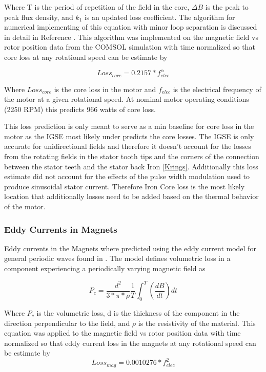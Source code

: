 \documentclass[]{aiaa-tc}%
\begin{document}
Where T is the period of repetition of the field in the core, $\Delta B$ is the peak to peak flux density, and $k_{1}$ is an updated loss coefficient. The algorithm for numerical implementing of this equation with minor loop separation is discussed in detail in Reference \cite{CoreLoss}. This algorithm was implemented on the magnetic field vs rotor position data from the COMSOL simulation with time normalized so that core loss at any rotational speed can be estimate by

\begin{equation}
Loss_{core} = 0.2157*f_{elec}^{\alpha}
\label{eq:CoreLoss3}
\end{equation}

Where $Loss_{core}$ is the core loss in the motor and $f_{elec}$ is the electrical frequency of the motor at a given rotational speed. At nominal motor operating conditions (2250 RPM) this predicts 966 watts of core loss. 

This loss prediction is only meant to serve as a min baseline for core loss in the motor as the IGSE most likely under predicts the core losses. The IGSE is only accurate for unidirectional fields and therefore it doesn’t account for the losses from the rotating fields in the stator tooth tips and the corners of the connection between the stator teeth and the stator back Iron \ref{Krings}. Additionally this loss estimate did not account for the effects of the pulse width modulation used to produce sinusoidal stator current. Therefore Iron Core loss is the most likely location that additionally losses need to be added based on the thermal behavior of the motor. 
\subsubsection{Eddy Currents in Magnets}
Eddy currents in the Magnets where predicted using the eddy current model for general periodic waves found in \cite{Roshen}. The model defines volumetric loss in a component experiencing a periodically varying magnetic field as 

\begin{equation}
P_{c} = \frac{d^2}{3*\pi*\rho}\frac{1}{T}\int_{0}^{T}(\frac{dB}{dt})dt
\label{eq:EddyLoss}
\end{equation}

Where $P_{c}$ is the volumetric loss, d is the thickness of the component in the direction perpendicular to the field, and $\rho$ is the resistivity of the material. This equation was applied to the magnetic field vs rotor position data with time normalized so that eddy current loss in the magnets at any rotational speed can be estimate by 
\begin{equation}
Loss_{mag} = 0.0010276*f_{elec}^{2}
\label{eq:EddyLoss2}
\end{equation}
\end{document}
